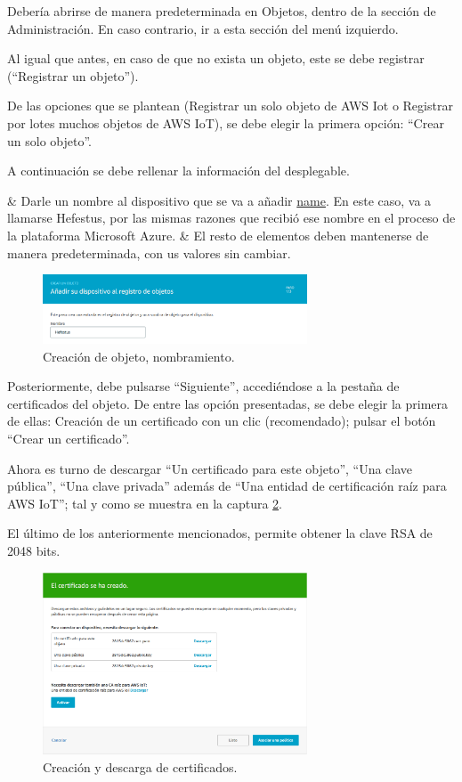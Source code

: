 \documentclass[english,runningheads,a4paper]{llncs}[2018/03/10]
\begin{document}
Debería abrirse de manera predeterminada en Objetos, dentro de la sección de
Administración. En caso contrario, ir a esta sección del menú izquierdo.

Al igual que antes, en caso de que no exista un objeto, este se debe registrar
(``Registrar un objeto'').

De las opciones que se plantean (Registrar un solo objeto de AWS Iot o Registrar
por lotes muchos objetos de AWS IoT), se debe elegir la primera opción: ``Crear
un solo objeto''.

A continuación se debe rellenar la información del desplegable. 

\begin{easylist}[itemize]
  & Darle un nombre al dispositivo que se va a añadir \hyperref[name]{name}. En 
  este caso, va a llamarse Hefestus, por las mismas razones que recibió ese 
  nombre en el proceso de la plataforma Microsoft Azure.
  & El resto de elementos deben mantenerse de manera predeterminada, con us
  valores sin cambiar.
\end{easylist}

\begin{figure}[h!]
 \centering
 \includegraphics[width=0.7\textwidth]{./IoT/AWS/2-2_name.png}
 \caption{Creación de objeto, nombramiento.}
 \label{name}
\end{figure}

Posteriormente, debe pulsarse ``Siguiente'', accediéndose a la pestaña de
certificados del objeto. De entre las opción presentadas, se debe elegir la
primera de ellas: Creación de un certificado con un clic (recomendado); pulsar
el botón ``Crear un certificado''.

Ahora es turno de descargar ``Un certificado para este objeto'', ``Una clave
pública'', ``Una clave privada'' además de ``Una entidad de certificación raíz
para AWS IoT''; tal y como se muestra en la captura
\hyperref[certificate]{\ref{certificate}}.

El último de los anteriormente mencionados, permite obtener la clave RSA de 2048
bits.

\begin{figure}[h!]
 \centering
 \includegraphics[width=0.7\textwidth]{./IoT/AWS/2-3_certificate.png}
 \caption{Creación y descarga de certificados.}
 \label{certificate}
\end{figure}
\end{document}
